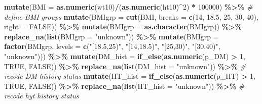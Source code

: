 \documentclass[
]{article}
\newenvironment{Shaded}{\begin{snugshade}}{\end{snugshade}}
\newcommand{\CommentTok}[1]{\textcolor[rgb]{0.56,0.35,0.01}{\textit{#1}}}
\newcommand{\DataTypeTok}[1]{\textcolor[rgb]{0.13,0.29,0.53}{#1}}
\newcommand{\DecValTok}[1]{\textcolor[rgb]{0.00,0.00,0.81}{#1}}
\newcommand{\FloatTok}[1]{\textcolor[rgb]{0.00,0.00,0.81}{#1}}
\newcommand{\KeywordTok}[1]{\textcolor[rgb]{0.13,0.29,0.53}{\textbf{#1}}}
\newcommand{\NormalTok}[1]{#1}
\newcommand{\OperatorTok}[1]{\textcolor[rgb]{0.81,0.36,0.00}{\textbf{#1}}}
\newcommand{\OtherTok}[1]{\textcolor[rgb]{0.56,0.35,0.01}{#1}}
\newcommand{\StringTok}[1]{\textcolor[rgb]{0.31,0.60,0.02}{#1}}
\begin{document}
\begin{Shaded}
\begin{Highlighting}[]
\StringTok{  }\KeywordTok{mutate}\NormalTok{(}\DataTypeTok{BMI =} \KeywordTok{as.numeric}\NormalTok{(wt10)}\OperatorTok{/}\NormalTok{(}\KeywordTok{as.numeric}\NormalTok{(ht10)}\OperatorTok{\^{}}\DecValTok{2}\NormalTok{) }\OperatorTok{*}\StringTok{ }\DecValTok{100000}\NormalTok{) }\OperatorTok{\%\textgreater{}\%}\StringTok{ }\CommentTok{\# define BMI groups}
\StringTok{  }\KeywordTok{mutate}\NormalTok{(}\DataTypeTok{BMIgrp =} \KeywordTok{cut}\NormalTok{(BMI, }\DataTypeTok{breaks =} \KeywordTok{c}\NormalTok{(}\DecValTok{14}\NormalTok{, }\FloatTok{18.5}\NormalTok{, }\DecValTok{25}\NormalTok{, }\DecValTok{30}\NormalTok{, }\DecValTok{40}\NormalTok{), }\DataTypeTok{right =} \OtherTok{FALSE}\NormalTok{)) }\OperatorTok{\%\textgreater{}\%}\StringTok{ }
\StringTok{  }\KeywordTok{mutate}\NormalTok{(}\DataTypeTok{BMIgrp =} \KeywordTok{as.character}\NormalTok{(BMIgrp)) }\OperatorTok{\%\textgreater{}\%}\StringTok{ }
\StringTok{  }\KeywordTok{replace\_na}\NormalTok{(}\KeywordTok{list}\NormalTok{(}\DataTypeTok{BMIgrp =} \StringTok{"unknown"}\NormalTok{)) }\OperatorTok{\%\textgreater{}\%}\StringTok{ }
\StringTok{  }\KeywordTok{mutate}\NormalTok{(}\DataTypeTok{BMIgrp =} \KeywordTok{factor}\NormalTok{(BMIgrp, }\DataTypeTok{levels =} \KeywordTok{c}\NormalTok{(}\StringTok{"[18.5,25)"}\NormalTok{,}
                                            \StringTok{"[14,18.5)"}\NormalTok{,}
                                            \StringTok{"[25,30)"}\NormalTok{, }
                                            \StringTok{"[30,40)"}\NormalTok{, }\StringTok{"unknown"}\NormalTok{))) }\OperatorTok{\%\textgreater{}\%}
\StringTok{  }\KeywordTok{mutate}\NormalTok{(}\DataTypeTok{DM\_hist =} \KeywordTok{if\_else}\NormalTok{(}\KeywordTok{as.numeric}\NormalTok{(p\_DM) }\OperatorTok{\textgreater{}}\StringTok{ }\DecValTok{1}\NormalTok{, }\OtherTok{TRUE}\NormalTok{, }\OtherTok{FALSE}\NormalTok{)) }\OperatorTok{\%\textgreater{}\%}\StringTok{ }
\StringTok{  }\KeywordTok{replace\_na}\NormalTok{(}\KeywordTok{list}\NormalTok{(}\DataTypeTok{DM\_hist =} \StringTok{"unknown"}\NormalTok{)) }\OperatorTok{\%\textgreater{}\%}\StringTok{ }\CommentTok{\# recode DM history status}
\StringTok{  }\KeywordTok{mutate}\NormalTok{(}\DataTypeTok{HT\_hist =} \KeywordTok{if\_else}\NormalTok{(}\KeywordTok{as.numeric}\NormalTok{(p\_HT) }\OperatorTok{\textgreater{}}\StringTok{ }\DecValTok{1}\NormalTok{, }\OtherTok{TRUE}\NormalTok{, }\OtherTok{FALSE}\NormalTok{)) }\OperatorTok{\%\textgreater{}\%}\StringTok{ }
\StringTok{  }\KeywordTok{replace\_na}\NormalTok{(}\KeywordTok{list}\NormalTok{(}\DataTypeTok{HT\_hist =} \StringTok{"unknown"}\NormalTok{)) }\OperatorTok{\%\textgreater{}\%}\StringTok{ }\CommentTok{\# recode hyt history status}

\end{Highlighting}
\end{Shaded}
\end{document}
